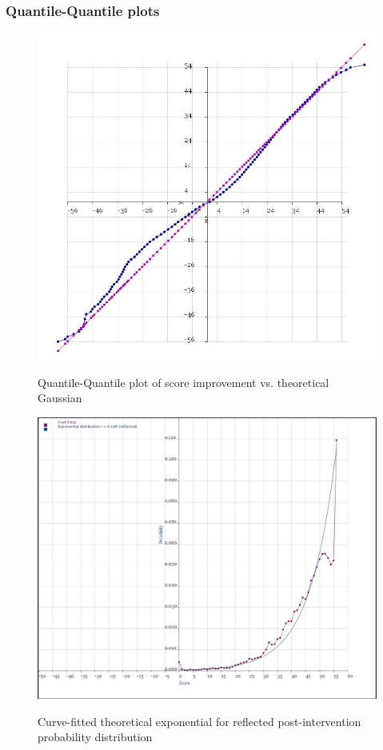 \documentclass[10pt]{article}
\begin{document}
\subsubsection{Quantile-Quantile plots}
\begin{figure}
\caption{Quantile-Quantile plot of score improvement vs. theoretical Gaussian}
\label{NormalProbabilityPlotImprovement}
\begin{center}
\includegraphics[width=120mm]{ReportMedia/NormalProbabilityPlotImprovement.jpg}\\
\end{center}
\end{figure}
\newpage
\begin{figure}
\caption{Curve-fitted theoretical exponential for reflected post-intervention probability distribution}
\label{ExponentialProbabilityPost}
\begin{center}
\includegraphics[width=160mm]{ReportMedia/ExponentialProbabilityPost.jpg}\\
\end{center}
\end{figure}
\end{document}
